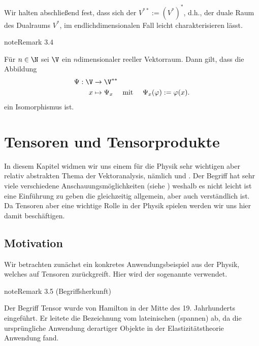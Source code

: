 \documentclass[letterpaper,10pt,english]{jupyterBook}
\begin{document}
\sphinxAtStartPar
Wir halten abschließend fest, dass sich der  \(V^{\ast\ast} := (V^\ast)^\ast\), d.h., der duale Raum des Dualraums \(V^\ast\), im endlich\sphinxhyphen{}dimensionalen Fall leicht charakterisieren lässt.
\label{vektoranalysis/multilinear:rem:doubledual}
\begin{sphinxadmonition}{note}{Remark 3.4}



\sphinxAtStartPar
Für \(n \in \N\) sei \(\V\) ein \(n\)\sphinxhyphen{}dimensionaler reeller Vektorraum.
Dann gilt, dass die Abbildung
\begin{equation*}
\begin{split}\Psi :\V &\rightarrow \V^{\ast\ast}\\
x &\mapsto \Psi_x \quad \text{ mit } \quad \Psi_x(\varphi) := \varphi(x).\end{split}
\end{equation*}
\sphinxAtStartPar
ein Isomorphismus ist.
\end{sphinxadmonition}


\section{Tensoren und Tensorprodukte}
\label{\detokenize{vektoranalysis/tensor:tensoren-und-tensorprodukte}}\label{\detokenize{vektoranalysis/tensor::doc}}
\sphinxAtStartPar
In diesem Kapitel widmen wir uns einem für die Physik sehr wichtigen aber relativ abstrakten Thema der Vektoranalysis, nämlich  und .
Der Begriff hat sehr viele verschiedene Anschauungsmöglichkeiten (siehe ) weshalb es nicht leicht ist eine Einführung zu geben die gleichzeitig allgemein, aber auch verständlich ist. Da Tensoren aber eine wichtige Rolle in der Physik spielen werden wir uns hier damit beschäftigen.


\subsection{Motivation}
\label{\detokenize{vektoranalysis/tensor:motivation}}
\sphinxAtStartPar
Wir betrachten zunächst ein konkretes Anwendungsbeispiel aus der Physik, welches auf Tensoren zurückgreift.
Hier wird der sogenannte  verwendet.
\label{vektoranalysis/tensor:remark-0}
\begin{sphinxadmonition}{note}{Remark 3.5 (Begriffsherkunft)}



\sphinxAtStartPar
Der Begriff Tensor wurde von Hamilton in der Mitte des 19. Jahrhunderts eingeführt. Er leitete die Bezeichnung vom lateinischen  (spannen) ab, da die ursprüngliche Anwendung derartiger Objekte in der Elastizitätstheorie Anwendung fand.
\end{sphinxadmonition}
\end{document}
